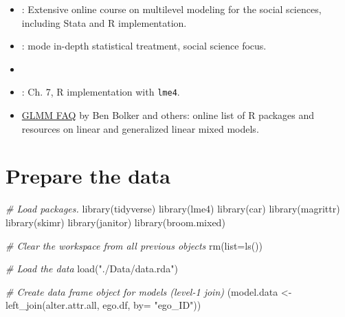 \documentclass[
]{book}
\newenvironment{Shaded}{\begin{snugshade}}{\end{snugshade}}
\newcommand{\AttributeTok}[1]{\textcolor[rgb]{0.77,0.63,0.00}{#1}}
\newcommand{\CommentTok}[1]{\textcolor[rgb]{0.56,0.35,0.01}{\textit{#1}}}
\newcommand{\FunctionTok}[1]{\textcolor[rgb]{0.00,0.00,0.00}{#1}}
\newcommand{\NormalTok}[1]{#1}
\newcommand{\OtherTok}[1]{\textcolor[rgb]{0.56,0.35,0.01}{#1}}
\newcommand{\StringTok}[1]{\textcolor[rgb]{0.31,0.60,0.02}{#1}}
\providecommand{\tightlist}{%
  \setlength{\itemsep}{0pt}\setlength{\parskip}{0pt}}
\begin{document}
\begin{itemize}
\tightlist
\item
  \href{https://www.cmm.bris.ac.uk/lemma}{\citet{rasbash_lemma:_2008}}: Extensive online course on multilevel modeling for the social sciences, including Stata and R implementation.
\item
  \citet{snijders_multilevel_2012}: mode in-depth statistical treatment, social science focus.
\item
  \citet{goldstein_multilevel_2010}
\item
  \citet{fox_r_2018}: Ch. 7, R implementation with \texttt{lme4}.
\item
  \href{http://bbolker.github.io/mixedmodels-misc/glmmFAQ.html}{GLMM FAQ} by Ben Bolker and others: online list of R packages and resources on linear and generalized linear mixed models.
\end{itemize}

\hypertarget{prepare-the-data}{%
\section{Prepare the data}\label{prepare-the-data}}

\begin{Shaded}
\begin{Highlighting}[]
\CommentTok{\# Load packages.}
\FunctionTok{library}\NormalTok{(tidyverse)}
\FunctionTok{library}\NormalTok{(lme4)}
\FunctionTok{library}\NormalTok{(car)}
\FunctionTok{library}\NormalTok{(magrittr)}
\FunctionTok{library}\NormalTok{(skimr)}
\FunctionTok{library}\NormalTok{(janitor)}
\FunctionTok{library}\NormalTok{(broom.mixed)}

\CommentTok{\# Clear the workspace from all previous objects}
\FunctionTok{rm}\NormalTok{(}\AttributeTok{list=}\FunctionTok{ls}\NormalTok{())}

\CommentTok{\# Load the data}
\FunctionTok{load}\NormalTok{(}\StringTok{"./Data/data.rda"}\NormalTok{)}

\CommentTok{\# Create data frame object for models (level{-}1 join)}
\NormalTok{(model.data }\OtherTok{\textless{}{-}} \FunctionTok{left\_join}\NormalTok{(alter.attr.all, ego.df, }\AttributeTok{by=} \StringTok{"ego\_ID"}\NormalTok{))}
\end{Highlighting}
\end{Shaded}
\end{document}
